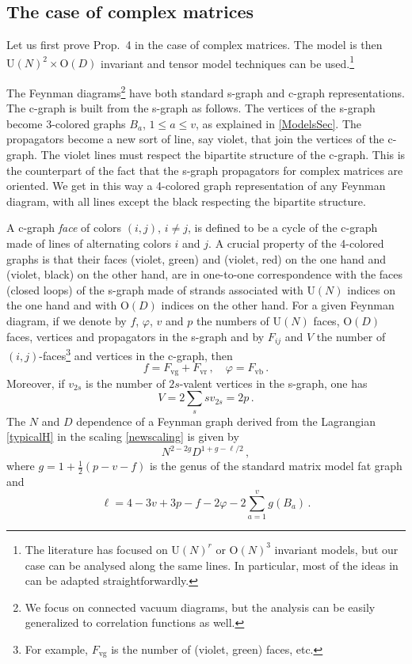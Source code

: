 \documentclass[12pt]{article}
\numberwithin{equation}{section}
\def\be{\begin{equation}}\def\ee{\end{equation}}
\begin{document}
%
\subsection{\label{CpxeSec} The case of complex matrices}
%

Let us first prove Prop.\ 4 in the case of complex matrices. The model is then $\text{U}(N)^{2}\times\text{O}(D)$ invariant and tensor model techniques can be used.\footnote{The literature has focused on $\text{U}(N)^{r}$ or $\text{O}(N)^{3}$ invariant models, but our case can be analysed along the same lines. In particular, most of the ideas in \cite{Carrozzaetal} can be adapted straightforwardly.} 

The Feynman diagrams\footnote{We focus on connected vacuum diagrams, but the analysis can be easily generalized to correlation functions as well.} have both standard s-graph and c-graph representations. The c-graph is built from the s-graph as follows. The vertices of the s-graph become 3-colored graphs $B_{a}$, $1\leq a\leq v$, as explained in \ref{ModelsSec}. The propagators become a new sort of line, say violet, that join the vertices of the c-graph. The violet lines must respect the bipartite structure of the c-graph. This is the  counterpart of the fact that the s-graph propagators for complex matrices are oriented. We get in this way a 4-colored graph representation of any Feynman diagram, with all lines except the black respecting the bipartite structure.

A c-graph \emph{face} of colors $(i,j)$, $i\not = j$, is defined to be a cycle of the c-graph made of lines of alternating colors $i$ and $j$. A crucial property of the 4-colored graphs is that their faces (violet, green) and (violet, red) on the one hand and (violet, black) on the other hand, are in one-to-one correspondence with the faces (closed loops) of the s-graph made of strands associated with $\text{U}(N)$ indices on the one hand and with $\text{O}(D)$ indices on the other hand. For a given Feynman diagram, if we denote by $f$, $\varphi$, $v$ and $p$ the numbers of $\text{U}(N)$ faces, $\text{O}(D)$ faces, vertices and propagators in the s-graph  and by $F_{ij}$ and $V$ the number of $(i,j)$-faces\footnote{For example, $F_{\text{vg}}$ is the number of (violet, green) faces, etc.} and vertices in the c-graph, then
%
\be\label{relationstoc} f=F_{\text{vg}} + F_{\text{vr}}\, ,\quad \varphi = F_{\text{vb}}\, . \ee
%
Moreover, if $v_{2s}$ is the number of $2s$-valent vertices in the s-graph, one has
%
\be\label{relationstoc2} V = 2\sum_{s} s v_{2s}= 2p\, .\ee
%
The $N$ and $D$ dependence of a Feynman graph derived from the Lagrangian \eqref{typicalH} in the scaling \eqref{newscaling} is given by
%
\be\label{Feynmangraph} N^{2-2g}D^{1+g-\ell/2}\, ,\ee
%
where $g=1+\frac{1}{2}(p-v-f)$ is the genus of the standard matrix model fat graph and
%
\be\label{ellformula} \ell =4-3 v + 3 p - f-2 \varphi-2 \sum_{a=1}^{v}g(B_{a})\, .\ee
%
\end{document}
